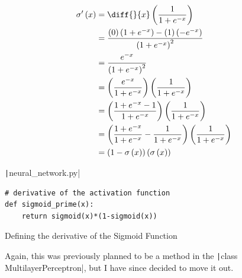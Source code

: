 \documentclass[12pt]{report}
\newcommand{\pil}[1]{\protect\texttt|#1|}
\begin{document}
\begin{equation}\label{eq:sigmoidDerivative}
\begin{split}
    {\sigma}^{\prime} \left(x\right)&=\diff{}{x}\left(\frac{1}{1+e^{-x}}\right) \\
    &=\frac{\left(0\right)\left(1+e^{-x}\right)-\left(1\right)\left(-e^{-x}\right)}{{\left(1+e^{-x}\right)}^2} \\
    &=\frac{e^{-x}}{{\left(1+e^{-x}\right)}^2} \\
    &=\left(\frac{e^{-x}}{1+e^{-x}}\right)\left(\frac{1}{1+e^{-x}}\right) \\
    &=\left(\frac{1+e^{-x}-1}{1+e^{-x}}\right)\left(\frac{1}{1+e^{-x}}\right) \\
    &=\left(\frac{1+e^{-x}}{1+e^{-x}}-\frac{1}{1+e^{-x}}\right)\left(\frac{1}{1+e^{-x}}\right) \\
    &=\left(1-\sigma\left(x\right)\right)\left(\sigma\left(x\right)\right)
\end{split}
\end{equation}

\begin{listing}[H]
\pil{neural_network.py}
\begin{verbatim}
# derivative of the activation function
def sigmoid_prime(x):
    return sigmoid(x)*(1-sigmoid(x))
\end{verbatim}
\caption{Defining the derivative of the Sigmoid Function}\label{cs:sigmoidPrimeFunction}
\end{listing}

Again, this was previously planned to be a method in the \pil{class MultilayerPerceptron}, but I have since decided to move it out.

\begin{center}
\end{center}
\end{document}

